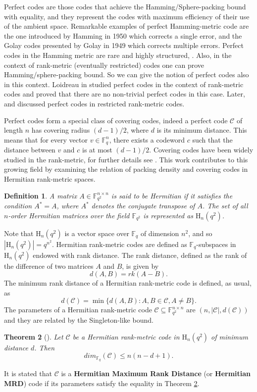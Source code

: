 \documentclass[12pt,a4paper]{article}
\newtheorem{theorem}{Theorem}[section]
\newtheorem{definition}[theorem]{Definition}
\begin{document}
Perfect codes are those codes that achieve the Hamming/Sphere-packing bound with equality, and they represent the codes with maximum efficiency of their use of the ambient space. Remarkable examples of perfect Hamming-metric code are the one introduced by Hamming \cite{hamming1950error} in 1950 which corrects a single error, and the Golay codes presented by Golay \cite{golay1949notes} in 1949 which corrects multiple errors. Perfect codes in the Hamming metric are rare and highly structured,  \cite{huffman2010fundamentals}. Also, in the context of rank-metric (eventually restricted) codes one can prove Hamming/sphere-packing bound. So we can give the notion of perfect codes also in this context. Loidreau in \cite{loidreau2006properties} studied perfect codes in the context of rank-metric codes and proved that there are no non-trivial perfect codes in this case. Later, \cite{abiad2024eigenvalue} and \cite{mushrraf2024perfect} discussed perfect codes in restricted rank-metric codes.

Perfect codes form a special class of covering codes, { indeed a perfect code $\mathscr{C}$ of length $n$ has covering radius $(d-1)/2$, where $d$ is its minimum distance. This means that for every vector $v\in \mathbb{F}^n_q$, there exists a codeword $c$ such that the distance between $v$ and $c$ is at most $(d-1)/2$. Covering codes have been widely studied in the rank-metric, for further details see \cite{bartoli2024saturating,bonini2023saturating,bonini2024geometry,zullo2024saturating}. This work contributes to this growing field by examining the relation of packing density and covering codes in Hermitian rank-metric spaces}. 
\begin{definition}
   A matrix $A\in \mathbb{F}^{n\times n}_{q^2}$ is said to be Hermitian if it satisfies the condition $A^{*}=A$, where $A^{*}$ denotes the conjugate transpose of $A$. The set of all $n$-order Hermitian matrices over the field $\mathbb{F}_{q^2}$ is represented as $\mathrm{H}_{n}(q^2)$.
\end{definition}
Note that $\mathrm{H}_n(q^2)$ is a vector space over $\mathbb{F}_q$ of dimension $n^2$, and so $|\mathrm{H}_n(q^2)|=q^{n^2}$. Hermitian rank-metric codes are defined as $\mathbb{F}_q$-subspaces in $\mathrm{H}_{n}(q^2)$ endowed with rank distance. The rank distance, defined as the rank of the difference of two matrices $A$ and $B$, is given by 
\[d(A,B)=rk(A-B).\] 
The minimum rank distance of a Hermitian rank-metric code is defined, as usual, as
  \[d(\mathscr{C})=\min\{d(A,B) \colon A,B \in \mathscr{C}, A\ne B\}.\]
 The parameters of a Hermitian rank-metric code $\mathscr{C}\subseteq \mathbb{F}^{n\times n}_{q^2}$ are $(n,|\mathscr{C}|,d(\mathscr{C}))$ and they are related by the Singleton-like bound.
\begin{theorem}[]\label{thm:dim}
    Let $\mathscr{C}$ be a Hermitian rank-metric code in $\mathrm{H}_{n}(q^2)$ of minimum distance $d$. Then 
    \[{dim_{\mathbb{F}_q}(\mathscr{C})\leq n(n-d+1)}.\]   
\end{theorem}
It is stated that $\mathscr{C}$ is a \textbf{Hermitian Maximum Rank Distance} (or \textbf{Hermitian MRD}) code if its parameters satisfy the equality in Theorem \ref{thm:dim}.
\end{document}
